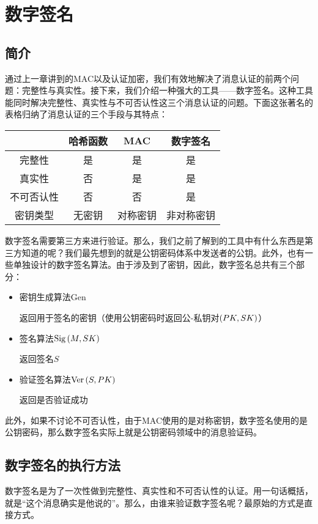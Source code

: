 \chapter{数字签名}
\section{简介}
通过上一章讲到的MAC以及认证加密，我们有效地解决了消息认证的前两个问题：完整性与真实性。接下来，我们介绍一种强大的工具——数字签名。这种工具能同时解决完整性、真实性与不可否认性这三个消息认证的问题。下面这张著名的表格归纳了消息认证的三个手段与其特点：
\begin{table}[H]
    \centering
    \begin{tabular}{c|c|c|c}\hline
        &哈希函数&MAC&数字签名\\\hline
        完整性&是&是&是\\\hline
        真实性&否&是&是\\\hline
        不可否认性&否&否&是\\\hline
        密钥类型&无密钥&对称密钥&非对称密钥\\\hline
    \end{tabular}
\end{table}

数字签名需要第三方来进行验证。那么，我们之前了解到的工具中有什么东西是第三方知道的呢？我们最先想到的就是公钥密码体系中发送者的公钥。此外，也有一些单独设计的数字签名算法。由于涉及到了密钥，因此，数字签名总共有三个部分：
\begin{itemize}
    \item 密钥生成算法Gen\par
    返回用于签名的密钥（使用公钥密码时返回公-私钥对$\left( {PK, SK}\right)$）
    \item 签名算法$\mathrm{Sig}\left( {M, SK}\right)$\par
    返回签名$S$
    \item 验证签名算法$\mathrm{Ver}\left( {S, PK}\right)$\par
    返回是否验证成功
\end{itemize}

此外，如果不讨论不可否认性，由于MAC使用的是对称密钥，数字签名使用的是公钥密码，那么数字签名实际上就是公钥密码领域中的消息验证码。
\section{数字签名的执行方法}
数字签名是为了一次性做到完整性、真实性和不可否认性的认证。用一句话概括，就是“这个消息确实是他说的”。那么，由谁来验证数字签名呢？最原始的方式是直接方式。
